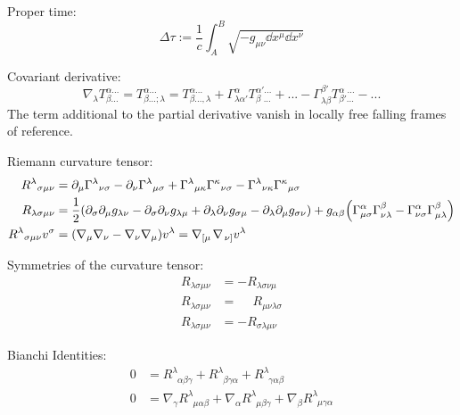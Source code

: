 			\noindent
			Proper time:
			\begin{equation}
				\Delta\tau := \frac{1}{c}\int_A^B\sqrt{-g_{\mu\nu}\dd x^\mu \dd x^\nu}
			\end{equation}

			\noindent
			Covariant derivative:
			\begin{equation}
				\nabla_\lambda T^{\alpha ...}_{\beta...} =
				T^{\alpha ...}_{\beta...;\lambda} = T^{\alpha...}_{\beta ...,\lambda}
				+ \Gamma^\alpha_{\lambda\alpha'} T^{\alpha'...}_{\beta\phantom{\prime}...} + ...
				-\Gamma^{\beta'}_{\lambda\beta} T^{\alpha\phantom{\prime}...}_{\beta'...} - ...
			\end{equation}
			The term additional to the partial derivative vanish in locally free falling frames of reference.

			\noindent
			Riemann curvature tensor:
			\begin{align}
				R^{\lambda}{}_{\sigma\mu\nu} &=
				\partial_{\mu}\Gamma^{\lambda}{}_{\nu\sigma} -
				\partial_{\nu}\Gamma^{\lambda}{}_{\mu\sigma} +
				\Gamma^{\lambda}{}_{\mu\kappa}\Gamma^{\kappa}{}_{\nu\sigma} -
				\Gamma^{\lambda}{}_{\nu\kappa}\Gamma^{\kappa}{}_{\mu\sigma} \\
				R_{\lambda\sigma\mu\nu} &= \frac{1}{2}\qty(
				\partial_\sigma \partial_\mu g_{\lambda\nu} - \partial_\sigma \partial_\nu g_{\lambda\mu} + \partial_\lambda \partial_\nu g_{\sigma\mu} - \partial_\lambda \partial_\mu g_{\sigma\nu})
				+ g_{\alpha\beta} \qty(
				\Gamma^{\alpha}_{\mu\sigma} \Gamma^{\beta}_{\nu\lambda} - \Gamma^{\alpha}_{\nu\sigma} \Gamma^{\beta}_{\mu\lambda})
				\\
				R^{\lambda}{}_{\sigma\mu\nu}v^\sigma &= \qty(\nabla_\mu \nabla_\nu - \nabla_\nu \nabla_\mu) v^\lambda = \nabla_{\left[\mu\right.}\nabla_{\left.\nu\right]} v^\lambda
			\end{align}

			\noindent
			Symmetries of the curvature tensor:
			\begin{align}
				R_{\lambda\sigma\mu\nu} &= - R_{\lambda\sigma\nu\mu} \\
				R_{\lambda\sigma\mu\nu} &= \phantom{-} R_{\mu\nu\lambda\sigma} \\
				R_{\lambda\sigma\mu\nu} &= - R_{\sigma\lambda\mu\nu}
			\end{align}

			\noindent
			Bianchi Identities:
			\begin{align}
				0 &= R^{\lambda}_{\phantom{\lambda}\alpha\beta\gamma} + R^{\lambda}_{\phantom{\lambda}\beta\gamma\alpha} + R^{\lambda}_{\phantom{\lambda}\gamma\alpha\beta} \\
				0 &= \nabla_\gamma R^{\lambda}_{\phantom{\lambda}\mu\alpha\beta} + \nabla_\alpha R^{\lambda}_{\phantom{\lambda}\mu\beta\gamma} + \nabla_\beta R^{\lambda}_{\phantom{\lambda}\mu\gamma\alpha}
			\end{align}

